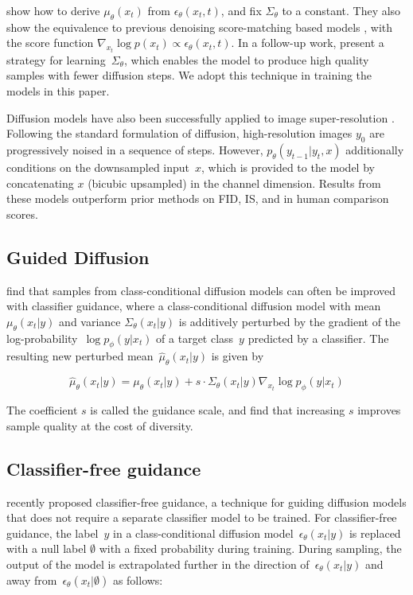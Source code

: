 \citet{ddpm} show how to derive $\mu_{\theta}(x_t)$ from $\epsilon_{\theta}(x_t, t)$, and fix $\Sigma_{\theta}$ to a constant. They also show the equivalence to previous denoising score-matching based models \cite{scorematching,improvedscore}, with the score function $\nabla_{x_t} \log p(x_t) \propto \epsilon_{\theta}(x_t, t)$. In a follow-up work, \citet{improved} present a strategy for learning~$\Sigma_{\theta}$, which enables the model to produce high quality samples with fewer diffusion steps. We adopt this technique in training the models in this paper.

Diffusion models have also been successfully applied to image super-resolution \cite{improved,sr3}. Following the standard formulation of diffusion, high-resolution images $y_0$ are progressively noised in a sequence of steps. However, $p_\theta(y_{t-1} | y_t, x)$ additionally conditions on the downsampled input~$x$, which is provided to the model by concatenating $x$ (bicubic upsampled) in the channel dimension. Results from these models outperform prior methods on FID, IS, and in human comparison scores.

\subsection{Guided Diffusion}
\label{sec:guideddiffusion}

\citet{sotapaper} find that samples from class-conditional diffusion models can often be improved with classifier guidance, where a class-conditional diffusion model with mean~$\mu_{\theta}(x_t|y)$ and variance $\Sigma_{\theta}(x_t|y)$ is additively perturbed by the gradient of the log-probability~$\log p_{\phi}(y|x_t)$ of a target class~$y$ predicted by a classifier. The resulting new perturbed mean~$\hat{\mu}_{\theta}(x_t|y)$ is given by 

$$\hat{\mu}_{\theta}(x_t|y) = \mu_{\theta}(x_t|y) + s \cdot \Sigma_{\theta}(x_t|y) \nabla_{x_t} \log p_{\phi}(y|x_t)$$

The coefficient $s$ is called the guidance scale, and \citet{sotapaper} find that increasing $s$ improves sample quality at the cost of diversity.

\subsection{Classifier-free guidance}
\label{sec:uncondguidance}
\citet{uncond} recently proposed classifier-free guidance, a technique for guiding diffusion models that does not require a separate classifier model to be trained. For classifier-free guidance, the label~$y$ in a class-conditional diffusion model~$\epsilon_{\theta}(x_t|y)$ is replaced with a null label $\emptyset$ with a fixed probability during training. During sampling, the output of the model is extrapolated further in the direction of~$\epsilon_{\theta}(x_t|y)$ and away from~$\epsilon_{\theta}(x_t|\emptyset)$ as follows:

